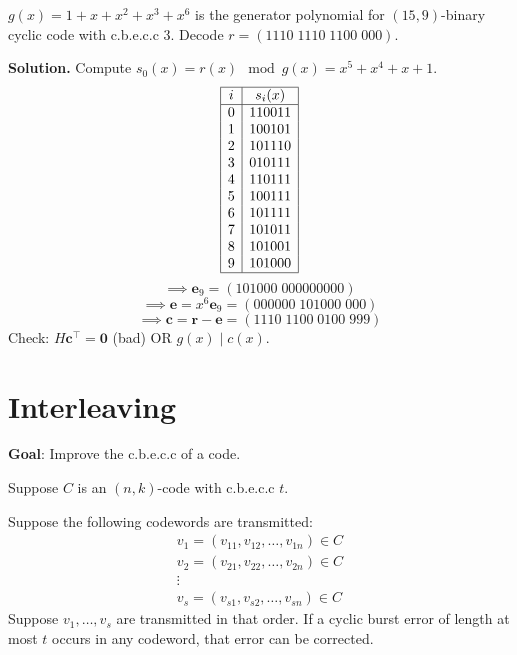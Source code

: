 \begin{exbox}
    \begin{example}
        $ g(x)=1+x+x^2+x^3+x^6 $ is the generator polynomial for $ (15,9) $-binary
        cyclic code with c.b.e.c.c $ 3 $. Decode $ r=(1110\; 1110\; 1100\; 000) $.

        \textbf{Solution.}
        Compute $ s_0(x)=r(x)\mod g(x)=x^5+x^4+x+1 $.
        \[ \begin{array}{|c|c|}
                \hline
                i & s_i(x) \\
                \hline
                0 & 110011 \\
                1 & 100101 \\
                2 & 101110 \\
                3 & 010111 \\
                4 & 110111 \\
                5 & 100111 \\
                6 & 101111 \\
                7 & 101011 \\
                8 & 101001 \\
                9 & 101000 \\
                \hline
            \end{array} \]
        \[ \implies \bm{e}_9=(101000\; 000000000) \]
        \[ \implies \bm{e}=x^6 \bm{e}_9=(000000\; 101000\;000 ) \]
        \[ \implies \bm{c}=\bm{r}-\bm{e}=(1110\;1100\;0100\;999) \]
        Check: $ H\bm{c}^\top=\bm{0} $ (bad) OR $ g(x)\mid c(x) $.
    \end{example}
\end{exbox}

\section{Interleaving}
\textbf{Goal}: Improve the c.b.e.c.c of a code.

Suppose $ C $ is an $ (n,k) $-code with c.b.e.c.c $ t $.

Suppose the following codewords are transmitted:
\[ \begin{array}{c}
        v_1=(v_{11},v_{12},\ldots ,v_{1n})\in C \\
        v_2=(v_{21},v_{22},\ldots ,v_{2n})\in C \\
        \vdots                                  \\
        v_s=(v_{s1},v_{s2},\ldots ,v_{sn})\in C
    \end{array} \]
Suppose $ v_1,\ldots ,v_s $ are transmitted in that order. If a cyclic burst error
of length at most $ t $ occurs in any codeword, that error can be corrected.

